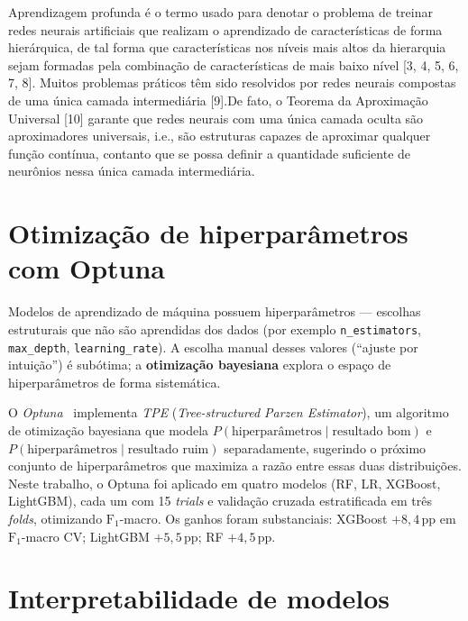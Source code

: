 \documentclass[tcc2]{uftex}
\begin{document}
\noindent
\begin{quoting}[rightmargin=0cm,leftmargin=4cm]
\begin{singlespace}
{\footnotesize
Aprendizagem profunda é o termo usado para denotar o problema de treinar redes neurais artiﬁciais que realizam o aprendizado de características de forma hierárquica, de tal forma que características nos níveis mais altos da hierarquia sejam formadas pela combinação de características de mais baixo nível [3, 4, 5, 6, 7, 8]. Muitos problemas práticos têm sido resolvidos por redes neurais compostas de uma única camada intermediária [9].De fato, o Teorema da Aproximação Universal [10] garante que redes neurais com uma única camada oculta são aproximadores universais, i.e., são estruturas capazes de aproximar qualquer função contínua, contanto que se possa deﬁnir a quantidade suﬁciente de neurônios nessa única camada intermediária. \cite[p. 58]{Barioni17}
}
\end{singlespace}
\end{quoting}

\section{Otimização de hiperparâmetros com Optuna}
\label{sec:fund_optuna}

Modelos de aprendizado de máquina possuem hiperparâmetros --- escolhas estruturais que não são aprendidas dos dados (por exemplo \texttt{n\_estimators}, \texttt{max\_depth}, \texttt{learning\_rate}). A escolha manual desses valores (``ajuste por intuição'') é subótima; a \textbf{otimização bayesiana} explora o espaço de hiperparâmetros de forma sistemática.

O \emph{Optuna}~\cite{akiba2019optuna} implementa \emph{TPE} (\emph{Tree-structured Parzen Estimator}), um algoritmo de otimização bayesiana que modela \(P(\text{hiperparâmetros} \mid \text{resultado bom})\) e \(P(\text{hiperparâmetros} \mid \text{resultado ruim})\) separadamente, sugerindo o próximo conjunto de hiperparâmetros que maximiza a razão entre essas duas distribuições. Neste trabalho, o Optuna foi aplicado em quatro modelos (RF, LR, XGBoost, LightGBM), cada um com 15 \emph{trials} e validação cruzada estratificada em três \emph{folds}, otimizando \(\text{F}_1\)-macro. Os ganhos foram substanciais: XGBoost \(+8,4\,\text{pp}\) em \(\text{F}_1\)-macro CV; LightGBM \(+5,5\,\text{pp}\); RF \(+4,5\,\text{pp}\).

\section{Interpretabilidade de modelos}
\label{sec:fund_interpretabilidade}
\end{document}
